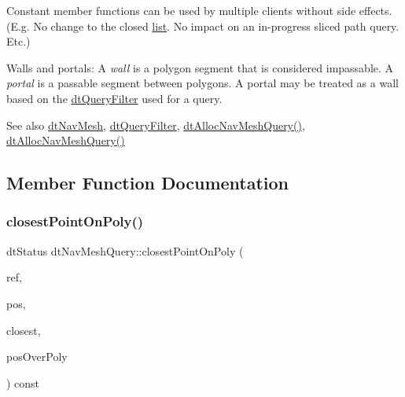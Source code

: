 Constant member functions can be used by multiple clients without side effects. (E.\+g. No change to the closed \hyperlink{protocollist-p}{list}. No impact on an in-\/progress sliced path query. Etc.)

Walls and portals\+: A {\itshape wall} is a polygon segment that is considered impassable. A {\itshape portal} is a passable segment between polygons. A portal may be treated as a wall based on the \hyperlink{classdtQueryFilter}{dt\+Query\+Filter} used for a query.

\begin{DoxySeeAlso}{See also}
\hyperlink{classdtNavMesh}{dt\+Nav\+Mesh}, \hyperlink{classdtQueryFilter}{dt\+Query\+Filter}, \hyperlink{group__detour_gae547f165feefc955136130c8e22f207a}{dt\+Alloc\+Nav\+Mesh\+Query()}, \hyperlink{group__detour_gae547f165feefc955136130c8e22f207a}{dt\+Alloc\+Nav\+Mesh\+Query()} 
\end{DoxySeeAlso}


\subsection{Member Function Documentation}
\mbox{\label{classdtNavMeshQuery_a07a90efe5d1a2b4b530aa236370574d9}} 
\subsubsection{\texorpdfstring{closest\+Point\+On\+Poly()}{closestPointOnPoly()}\hspace{0.1cm}{\footnotesize\ttfamily [1/2]}}
{\footnotesize\ttfamily dt\+Status dt\+Nav\+Mesh\+Query\+::closest\+Point\+On\+Poly (\begin{DoxyParamCaption}\item[{\hyperlink{group__detour_gab4e0b2257a670c1a800057999612b466}{dt\+Poly\+Ref}}]{ref,  }\item[{const float $\ast$}]{pos,  }\item[{float $\ast$}]{closest,  }\item[{bool $\ast$}]{pos\+Over\+Poly }\end{DoxyParamCaption}) const}

